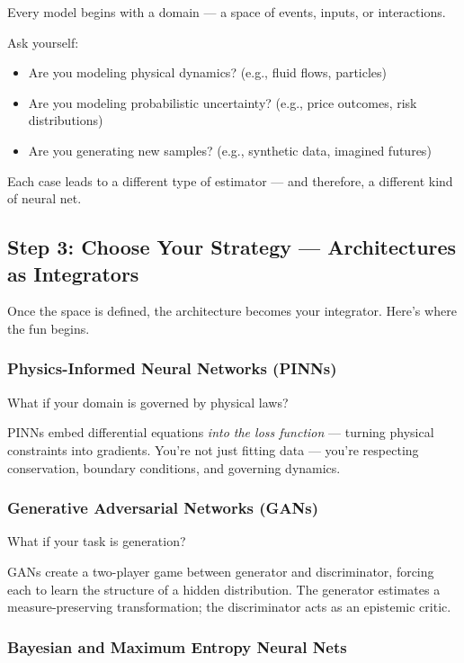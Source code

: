 Every model begins with a domain — a space of events, inputs, or interactions.

Ask yourself:
\begin{itemize}
  \item Are you modeling physical dynamics? (e.g., fluid flows, particles)
  \item Are you modeling probabilistic uncertainty? (e.g., price outcomes, risk distributions)
  \item Are you generating new samples? (e.g., synthetic data, imagined futures)
\end{itemize}

Each case leads to a different type of estimator — and therefore, a different kind of neural net.

\subsection{Step 3: Choose Your Strategy — Architectures as Integrators}

Once the space is defined, the architecture becomes your integrator. Here’s where the fun begins.

\subsubsection*{Physics-Informed Neural Networks (PINNs)}

What if your domain is governed by physical laws?

PINNs embed differential equations \textit{into the loss function} — turning physical constraints into gradients. You’re not just fitting data — you’re respecting conservation, boundary conditions, and governing dynamics.

\subsubsection*{Generative Adversarial Networks (GANs)}

What if your task is generation?

GANs create a two-player game between generator and discriminator, forcing each to learn the structure of a hidden distribution. The generator estimates a measure-preserving transformation; the discriminator acts as an epistemic critic.

\subsubsection*{Bayesian and Maximum Entropy Neural Nets}

